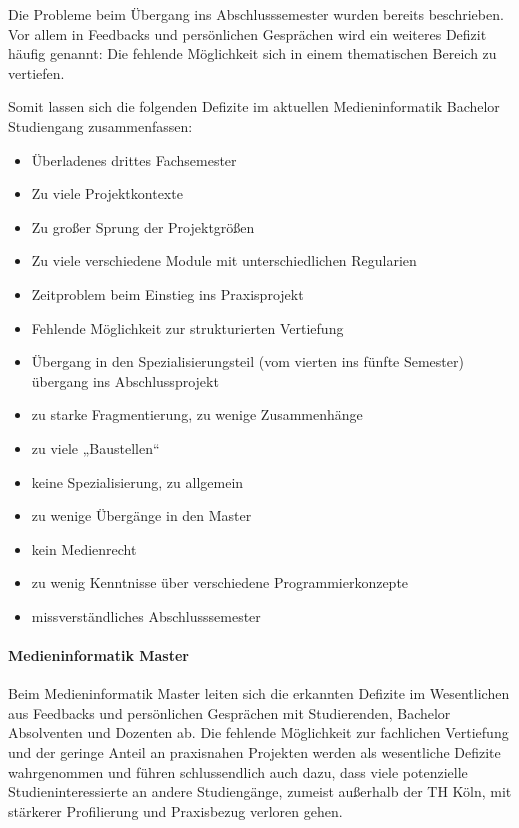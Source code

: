 Die Probleme beim Übergang ins Abschlusssemester wurden bereits
beschrieben. Vor allem in Feedbacks und persönlichen Gesprächen wird ein
weiteres Defizit häufig genannt: Die fehlende Möglichkeit sich in einem
thematischen Bereich zu vertiefen.

Somit lassen sich die folgenden Defizite im aktuellen Medieninformatik
Bachelor Studiengang zusammenfassen:

\begin{itemize}
\tightlist
\item
  Überladenes drittes Fachsemester
\item
  Zu viele Projektkontexte
\item
  Zu großer Sprung der Projektgrößen
\item
  Zu viele verschiedene Module mit unterschiedlichen Regularien
\item
  Zeitproblem beim Einstieg ins Praxisprojekt
\item
  Fehlende Möglichkeit zur strukturierten Vertiefung
\item
  Übergang in den Spezialisierungsteil (vom vierten ins fünfte Semester)
  übergang ins Abschlussprojekt
\item
  zu starke Fragmentierung, zu wenige Zusammenhänge
\item
  zu viele „Baustellen``
\item
  keine Spezialisierung, zu allgemein
\item
  zu wenige Übergänge in den Master
\item
  kein Medienrecht
\item
  zu wenig Kenntnisse über verschiedene Programmierkonzepte
\item
  missverständliches Abschlusssemester
\end{itemize}

\paragraph{Medieninformatik
Master\label{/mi-2017/selbstbericht/0100-ist-zustand/0100-ist-zustand}}\label{medieninformatik-masterpathlabelmi-2017selbstbericht0100-ist-zustand0100-ist-zustand}

Beim Medieninformatik Master leiten sich die erkannten Defizite im
Wesentlichen aus Feedbacks und persönlichen Gesprächen mit Studierenden,
Bachelor Absolventen und Dozenten ab. Die fehlende Möglichkeit zur
fachlichen Vertiefung und der geringe Anteil an praxisnahen Projekten
werden als wesentliche Defizite wahrgenommen und führen schlussendlich
auch dazu, dass viele potenzielle Studieninteressierte an andere
Studiengänge, zumeist außerhalb der TH Köln, mit stärkerer Profilierung
und Praxisbezug verloren gehen.

